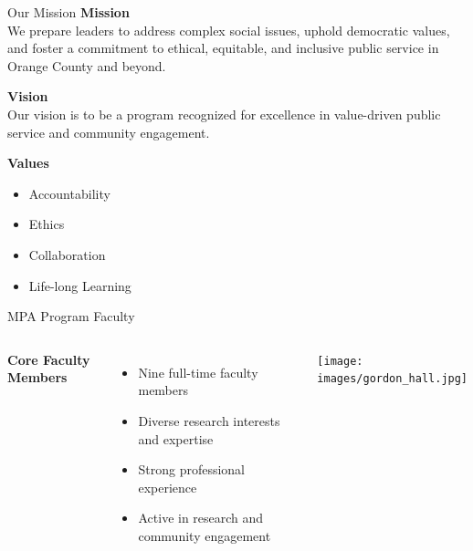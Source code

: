 \documentclass[10pt]{beamer}
\begin{document}
\begin{frame}{Our Mission}
    \textbf{Mission}\\
    We prepare leaders to address complex social issues, uphold democratic values, and foster a commitment to ethical, equitable, and inclusive public service in Orange County and beyond.
    
    \vspace{1em}
    
    \textbf{Vision}\\
    Our vision is to be a program recognized for excellence in value-driven public service and community engagement.
    
    \vspace{1em}
    
    \textbf{Values}
    \begin{itemize}
    \item Accountability
    \item Ethics
    \item Collaboration
    \item Life-long Learning
    \end{itemize}
\end{frame}

\begin{frame}{MPA Program Faculty}
    \begin{columns}[t]
    \textbf{Core Faculty Members}
    \begin{itemize}
    \item Nine full-time faculty members
    \item Diverse research interests and expertise
    \item Strong professional experience
    \item Active in research and community engagement
    \end{itemize}
    \texttt{[image: images/gordon\_hall.jpg]}
    \end{columns}
    \end{frame}
    
\end{document}
